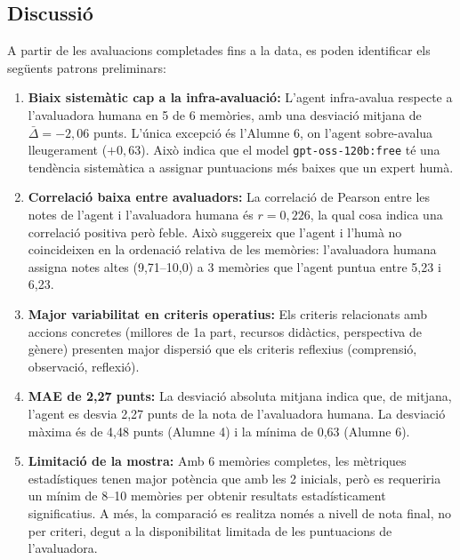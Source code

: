 \documentclass[12pt,a4paper,twoside]{report}
\begin{document}
\subsection{Discussi\'o}

A partir de les avaluacions completades fins a la data, es poden identificar els seg\"uents patrons preliminars:

\begin{enumerate}
    \item \textbf{Biaix sistem\`atic cap a la infra-avaluaci\'o:} L'agent infra-avalua respecte a l'avaluadora humana en 5 de 6 mem\`ories, amb una desviaci\'o mitjana de $\bar{\Delta} = -2,06$ punts. L'\'unica excepci\'o \'es l'Alumne 6, on l'agent sobre-avalua lleugerament ($+0,63$). Aix\`o indica que el model \texttt{gpt-oss-120b:free} t\'e una tend\`encia sistem\`atica a assignar puntuacions m\'es baixes que un expert hum\`a.

    \item \textbf{Correlaci\'o baixa entre avaluadors:} La correlaci\'o de Pearson entre les notes de l'agent i l'avaluadora humana \'es $r = 0,226$, la qual cosa indica una correlaci\'o positiva per\`o feble. Aix\`o suggereix que l'agent i l'hum\`a no coincideixen en la ordenaci\'o relativa de les mem\`ories: l'avaluadora humana assigna notes altes (9,71--10,0) a 3 mem\`ories que l'agent puntua entre 5,23 i 6,23.

    \item \textbf{Major variabilitat en criteris operatius:} Els criteris relacionats amb accions concretes (millores de 1a part, recursos did\`actics, perspectiva de g\`enere) presenten major dispersi\'o que els criteris reflexius (comprensi\'o, observaci\'o, reflexi\'o).

    \item \textbf{MAE de 2,27 punts:} La desviaci\'o absoluta mitjana indica que, de mitjana, l'agent es desvia 2,27 punts de la nota de l'avaluadora humana. La desviaci\'o m\`axima \'es de 4,48 punts (Alumne 4) i la m\'inima de 0,63 (Alumne 6).

    \item \textbf{Limitaci\'o de la mostra:} Amb 6 mem\`ories completes, les m\`etriques estad\'istiques tenen major pot\`encia que amb les 2 inicials, per\`o es requeriria un m\'inim de 8--10 mem\`ories per obtenir resultats estad\'isticament significatius. A m\'es, la comparaci\'o es realitza nom\'es a nivell de nota final, no per criteri, degut a la disponibilitat limitada de les puntuacions de l'avaluadora.
\end{enumerate}
\end{document}
